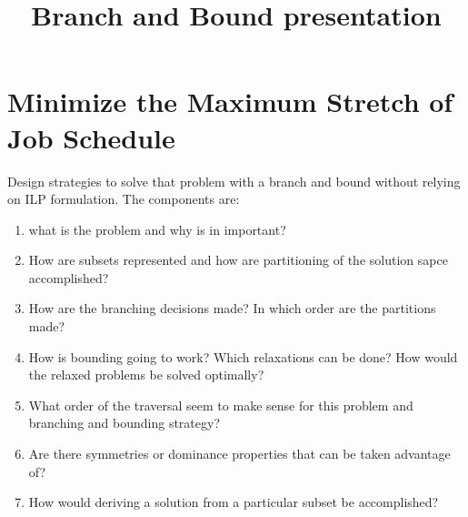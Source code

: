 \documentclass[11pt, conference, onecolumn]{IEEEtran}
\begin{document}
\title{Branch and Bound presentation }

\maketitle
\section*{Minimize the Maximum Stretch of Job Schedule}
Design strategies to  solve that problem with a branch and bound without relying on ILP formulation. The components are:
\begin{enumerate}

\item what is the problem and why is in important?

\item How are subsets represented and how are partitioning of the solution sapce accomplished?

\item How are the branching decisions made? In which order are the partitions made?

\item How is bounding going to work? Which relaxations can be done? How would the relaxed problems be solved optimally?

\item What order of the traversal seem to make sense for this problem and branching and bounding strategy?

\item Are there symmetries or dominance properties that can be taken advantage of?

\item How would deriving a solution from a particular subset be accomplished?

\end{enumerate}
\end{document}
